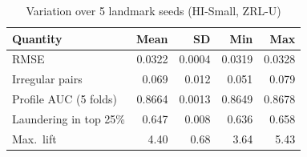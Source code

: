 \begin{table}[t]
\caption{Variation over 5 landmark seeds (HI-Small, ZRL-U)}
\label{tab:seeds}
\centering
\footnotesize
\begin{tabular}{@{}lrrrr@{}}
\toprule
Quantity & Mean & SD & Min & Max \\
\midrule
RMSE & 0.0322 & 0.0004 & 0.0319 & 0.0328 \\
Irregular pairs & 0.069 & 0.012 & 0.051 & 0.079 \\
Profile AUC (5 folds) & 0.8664 & 0.0013 & 0.8649 & 0.8678 \\
Laundering in top 25\% & 0.647 & 0.008 & 0.636 & 0.658 \\
Max.\ lift & 4.40 & 0.68 & 3.64 & 5.43 \\
\bottomrule
\end{tabular}
\end{table}

